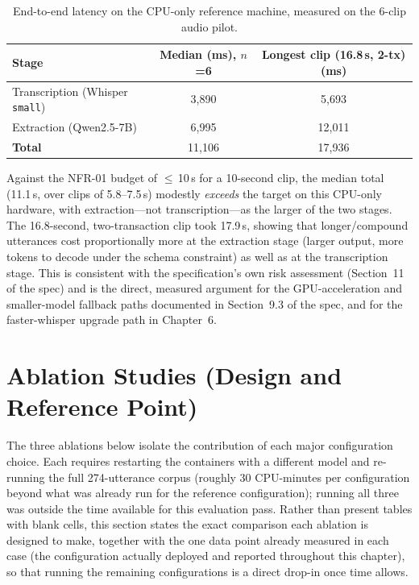 \begin{table}[H]
\centering
\caption{End-to-end latency on the CPU-only reference machine, measured on the 6-clip audio pilot.}
\label{tab:latency}
\small
\renewcommand{\arraystretch}{1.3}
\begin{tabularx}{\textwidth}{X c c}
\toprule
\textbf{Stage} & \textbf{Median (ms), $n$=6} & \textbf{Longest clip (16.8\,s, 2-tx) (ms)} \\
\midrule
Transcription (Whisper \texttt{small}) & 3{,}890 & 5{,}693 \\
Extraction (Qwen2.5-7B)                & 6{,}995 & 12{,}011 \\
\midrule
\textbf{Total}                         & 11{,}106 & 17{,}936 \\
\bottomrule
\end{tabularx}
\end{table}

Against the NFR-01 budget of $\leq$\,10\,s for a 10-second clip, the median
total (11.1\,s, over clips of 5.8--7.5\,s) modestly \emph{exceeds} the target
on this CPU-only hardware, with extraction---not transcription---as the larger
of the two stages. The 16.8-second, two-transaction clip took 17.9\,s, showing
that longer/compound utterances cost proportionally more at the extraction
stage (larger output, more tokens to decode under the schema constraint) as
well as at the transcription stage. This is consistent with the specification's
own risk assessment (Section~11 of the spec) and is the direct, measured
argument for the GPU-acceleration and smaller-model fallback paths documented
in Section~9.3 of the spec, and for the faster-whisper upgrade path in Chapter~6.

\section{Ablation Studies (Design and Reference Point)}

The three ablations below isolate the contribution of each major configuration
choice. Each requires restarting the containers with a different model and
re-running the full 274-utterance corpus (roughly 30 CPU-minutes per
configuration beyond what was already run for the reference configuration);
running all three was outside the time available for this evaluation pass.
Rather than present tables with blank cells, this section states the exact
comparison each ablation is designed to make, together with the one data
point already measured in each case (the configuration actually deployed and
reported throughout this chapter), so that running the remaining
configurations is a direct drop-in once time allows.

